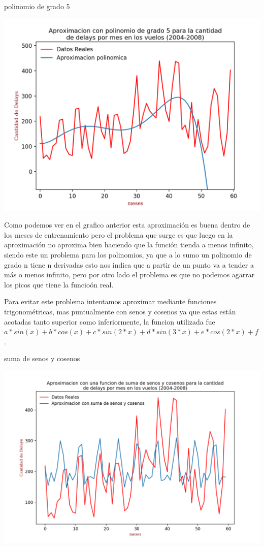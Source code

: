 \documentclass{endm}
\begin{document}
	\begin{center}
	\caption{polinomio de grado 5}
	\includegraphics[scale=0.7]{imagenes/delaysPolinomio.png}
	\end{center}

Como podemos ver en el grafico anterior esta aproximaci\'on es buena dentro de los meses de entrenamiento pero el problema que surge es que luego en la aproximaci\'on no aproxima bien haciendo que la funci\'on tienda a menos infinito, siendo este un problema para los polinomios, ya que a lo sumo un polinomio de grado n tiene n derivadas esto nos indica que a partir de un punto va a tender a m\'as o  menos infinito, pero por otro lado el problema es que no podemos agarrar los picos que tiene la funcio\'on real.

Para evitar este problema intentamos aproximar mediante funciones trigonom\'etricas, mas puntualmente con senos y cosenos ya que estas están acotadas tanto superior como inferiormente, la funcion utilizada fue $a*sin(x)+ b*cos(x)+c*sin(2*x)+ d*sin(3*x)+ e*cos(2*x)+f$.

	\begin{center}
	\caption{suma de senos y cosenos}
	\includegraphics[scale=0.6]{imagenes/senosCosenos.png}
	\end{center}
\end{document}
